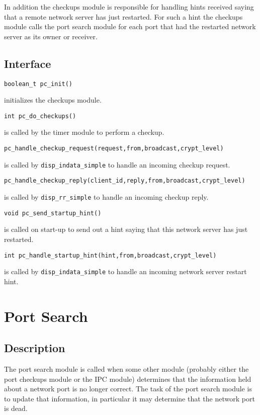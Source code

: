 In addition the checkups module is responsible for handling hints received
saying that a remote network server has just restarted.  For such a hint the
checkups module calls the port search module for each port that had the
restarted network server as its owner or receiver.

\subsection{Interface}
\begin{verbatim}
boolean_t pc_init()
\end{verbatim}
initializes the checkups module.

\begin{verbatim}
int pc_do_checkups()
\end{verbatim}
is called by the timer module to perform a checkup.

\begin{verbatim}
pc_handle_checkup_request(request,from,broadcast,crypt_level)
\end{verbatim}
is called by \verb"disp_indata_simple" to handle an incoming checkup request.

\begin{verbatim}
pc_handle_checkup_reply(client_id,reply,from,broadcast,crypt_level)
\end{verbatim}
is called by \verb"disp_rr_simple" to handle an incoming checkup reply.

\begin{verbatim}
void pc_send_startup_hint()
\end{verbatim}
is called on start-up to send out a hint saying that this network server has
just restarted.

\begin{verbatim}
int pc_handle_startup_hint(hint,from,broadcast,crypt_level)
\end{verbatim}
is called by \verb"disp_indata_simple" to handle an incoming network server
restart hint.

\section{Port Search}
\subsection{Description}
The port search module is called when some other module (probably either the
port checkups module or the IPC module) determines that the information held
about a network port is no longer correct.  The task of the port search
module is to update that information, in particular it may determine that
the network port is dead.

